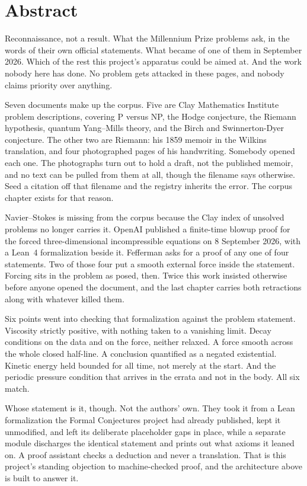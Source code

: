 \chapter*{Abstract}

Reconnaissance, not a result. What the Millennium Prize problems ask, in the words of their own
official statements. What became of one of them in September 2026. Which of the rest this project's
apparatus could be aimed at. And the work nobody here has done. No problem gets attacked in these
pages, and nobody claims priority over anything.

Seven documents make up the corpus. Five are Clay Mathematics Institute problem descriptions,
covering P versus NP, the Hodge conjecture, the Riemann hypothesis, quantum Yang--Mills theory, and
the Birch and Swinnerton-Dyer conjecture. The other two are Riemann: his 1859 memoir in the Wilkins
translation, and four photographed pages of his handwriting. Somebody opened each one. The
photographs turn out to hold a draft, not the published memoir, and no text can be pulled from them
at all, though the filename says otherwise. Seed a citation off that filename and the registry
inherits the error. The corpus chapter exists for that reason.

Navier--Stokes is missing from the corpus because the Clay index of unsolved problems no longer
carries it. OpenAI published a finite-time blowup proof for the forced three-dimensional
incompressible equations on 8 September 2026, with a Lean~4 formalization beside it. Fefferman asks
for a proof of any one of four statements. Two of those four put a smooth external force inside the
statement. Forcing sits in the problem as posed, then. Twice this work insisted otherwise before
anyone opened the document, and the last chapter carries both retractions along with whatever
killed them.

Six points went into checking that formalization against the problem statement. Viscosity strictly
positive, with nothing taken to a vanishing limit. Decay conditions on the data and on the force,
neither relaxed. A force smooth across the whole closed half-line. A conclusion quantified as a
negated existential. Kinetic energy held bounded for all time, not merely at the start. And the
periodic pressure condition that arrives in the errata and not in the body. All six match.

Whose statement is it, though. Not the authors' own. They took it from a Lean formalization the
Formal Conjectures project had already published, kept it unmodified, and left its deliberate
placeholder gaps in place, while a separate module discharges the identical statement and prints out
what axioms it leaned on. A proof assistant checks a deduction and never a translation. That is this
project's standing objection to machine-checked proof, and the architecture above is built to answer
it.

